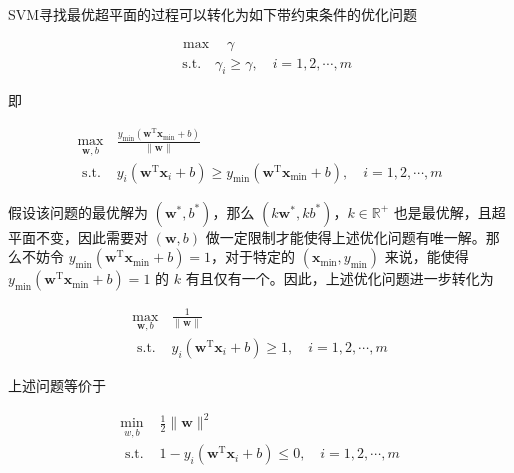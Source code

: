\documentclass{ctexart}
\begin{document}
	SVM寻找最优超平面的过程可以转化为如下带约束条件的优化问题
	
	\begin{equation}
		\begin{aligned}
			&\max\quad \gamma\\
			&\ \text{s.t.} \quad \gamma_{i} \geqslant \gamma, \quad i=1,2, \cdots, m
		\end{aligned}
	\end{equation}

	即
	
	\begin{equation}
		\begin{aligned}
			\max _{\boldsymbol{w}, b} & \frac{y_{\min }\left(\boldsymbol{w}^{\mathrm{T}} \boldsymbol{x}_{\min }+b\right)}{\|\boldsymbol{w}\|} \\
			\text { s.t. } & y_{i}\left(\boldsymbol{w}^{\mathrm{T}} \boldsymbol{x}_{i}+b\right) \geqslant y_{\min }\left(\boldsymbol{w}^{\mathrm{T}} \boldsymbol{x}_{\min }+b\right), \quad i=1,2, \cdots, m
		\end{aligned}
	\end{equation}

	假设该问题的最优解为 $(\boldsymbol{w}^\ast,b^\ast)$，那么 $(k\boldsymbol{w}^\ast,kb^\ast)$，$k\in\mathbb{R}^+$ 也是最优解，且超平面不变，因此需要对 $(\boldsymbol{w},b)$ 做一定限制才能使得上述优化问题有唯一解。那么不妨令 $y_{\min }\left(\boldsymbol{w}^{\mathrm{T}} \boldsymbol{x}_{\min }+b\right)=1$，对于特定的 $(\boldsymbol{x}_{\min},y_{\min})$ 来说，能使得 $y_{\min }\left(\boldsymbol{w}^{\mathrm{T}} \boldsymbol{x}_{\min }+b\right)=1$ 的 $k$ 有且仅有一个。因此，上述优化问题进一步转化为
	
	\begin{equation}
		\begin{array}{ll}
			\max\limits_{\boldsymbol{w}, b} & \frac{1}{\|\boldsymbol{w}\|} \\
			\text { s.t. } & y_{i}\left(\boldsymbol{w}^{\mathrm{T}} \boldsymbol{x}_{i} +b\right) \geqslant 1, \quad i=1,2, \cdots, m
		\end{array}
	\end{equation}

	上述问题等价于
	
	\begin{equation}
		\begin{array}{ll}
			\min\limits_{w, b} & \frac{1}{2}\|\boldsymbol{w}\|^{2} \\
			\text { s.t. } & 1-y_{i}\left(\boldsymbol{w}^{\mathrm{T}} \boldsymbol{x}_{i}+b\right) \leqslant 0, \quad i=1,2, \cdots, m
		\end{array}
		\label{主问题}
	\end{equation}
\end{document}
